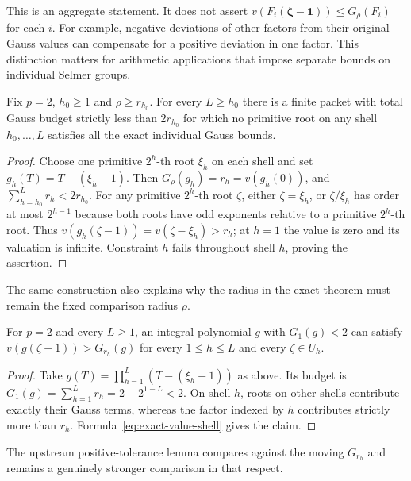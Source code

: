 This is an aggregate statement.  It does not assert
$v(F_i(\boldsymbol\zeta-\mathbf1))\leq G_\rho(F_i)$ for each $i$.
For example, negative deviations of other factors from their original
Gauss values can compensate for a positive deviation in one factor.
This distinction matters for arithmetic applications that impose
separate bounds on individual Selmer groups.

\begin{proposition}
\label{prop:individual-obstruction}
Fix $p=2$, $h_0\geq1$ and $\rho\geq r_{h_0}$.  For every $L\geq h_0$
there is a finite packet with total Gauss budget strictly less than
$2r_{h_0}$ for which no primitive root on any shell
$h_0,\ldots,L$ satisfies all the exact individual Gauss bounds.
\end{proposition}
\begin{proof}
Choose one primitive $2^h$-th root $\xi_h$ on each shell and set
$g_h(T)=T-(\xi_h-1)$.  Then
$G_\rho(g_h)=r_h=v(g_h(0))$, and
$\sum_{h=h_0}^Lr_h<2r_{h_0}$.
For any primitive $2^h$-th root $\zeta$, either $\zeta=\xi_h$, or
$\zeta/\xi_h$ has order at most $2^{h-1}$ because both roots have
odd exponents relative to a primitive $2^h$-th root.  Thus
$v(g_h(\zeta-1))=v(\zeta-\xi_h)>r_h$; at $h=1$ the value is zero
and its valuation is infinite.  Constraint $h$ fails throughout shell
$h$, proving the assertion.
\end{proof}

The same construction also explains why the radius in the exact
theorem must remain the fixed comparison radius $\rho$.

\begin{proposition}
\label{prop:moving-gauss-obstruction}
For $p=2$ and every $L\geq1$, an integral polynomial $g$ with
$G_1(g)<2$ can satisfy
$v(g(\zeta-1))>G_{r_h}(g)$ for every $1\leq h\leq L$ and every
$\zeta\in U_h$.
\end{proposition}
\begin{proof}
Take $g(T)=\prod_{h=1}^L(T-(\xi_h-1))$ as above.
Its budget is $G_1(g)=\sum_{h=1}^Lr_h=2-2^{1-L}<2$.
On shell $h$, roots on other shells contribute exactly their
Gauss terms, whereas the factor indexed by $h$ contributes strictly
more than $r_h$.  Formula~\eqref{eq:exact-value-shell} gives the claim.
\end{proof}

The upstream positive-tolerance lemma compares against the moving
$G_{r_h}$ and remains a genuinely stronger comparison in that respect.

